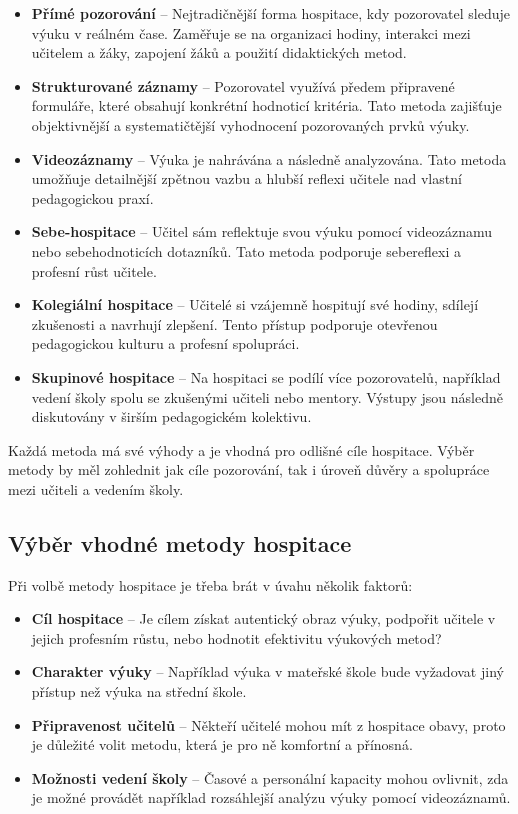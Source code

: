 \begin{itemize}
    \item \textbf{Přímé pozorování} – Nejtradičnější forma hospitace, kdy pozorovatel sleduje výuku v reálném čase. Zaměřuje se na organizaci hodiny, interakci mezi učitelem a žáky, zapojení žáků a použití didaktických metod.
    \item \textbf{Strukturované záznamy} – Pozorovatel využívá předem připravené formuláře, které obsahují konkrétní hodnoticí kritéria. Tato metoda zajišťuje objektivnější a systematičtější vyhodnocení pozorovaných prvků výuky.
    \item \textbf{Videozáznamy} – Výuka je nahrávána a následně analyzována. Tato metoda umožňuje detailnější zpětnou vazbu a hlubší reflexi učitele nad vlastní pedagogickou praxí.
    \item \textbf{Sebe-hospitace} – Učitel sám reflektuje svou výuku pomocí videozáznamu nebo sebehodnoticích dotazníků. Tato metoda podporuje sebereflexi a profesní růst učitele.
    \item \textbf{Kolegiální hospitace} – Učitelé si vzájemně hospitují své hodiny, sdílejí zkušenosti a navrhují zlepšení. Tento přístup podporuje otevřenou pedagogickou kulturu a profesní spolupráci.
    \item \textbf{Skupinové hospitace} – Na hospitaci se podílí více pozorovatelů, například vedení školy spolu se zkušenými učiteli nebo mentory. Výstupy jsou následně diskutovány v širším pedagogickém kolektivu.
\end{itemize}

Každá metoda má své výhody a je vhodná pro odlišné cíle hospitace. Výběr metody by měl zohlednit jak cíle pozorování, tak i úroveň důvěry a spolupráce mezi učiteli a vedením školy.

\subsection{Výběr vhodné metody hospitace}

Při volbě metody hospitace je třeba brát v úvahu několik faktorů:

\begin{itemize}
    \item \textbf{Cíl hospitace} – Je cílem získat autentický obraz výuky, podpořit učitele v jejich profesním růstu, nebo hodnotit efektivitu výukových metod?
    \item \textbf{Charakter výuky} – Například výuka v mateřské škole bude vyžadovat jiný přístup než výuka na střední škole.
    \item \textbf{Připravenost učitelů} – Někteří učitelé mohou mít z hospitace obavy, proto je důležité volit metodu, která je pro ně komfortní a přínosná.
    \item \textbf{Možnosti vedení školy} – Časové a personální kapacity mohou ovlivnit, zda je možné provádět například rozsáhlejší analýzu výuky pomocí videozáznamů.
\end{itemize}

